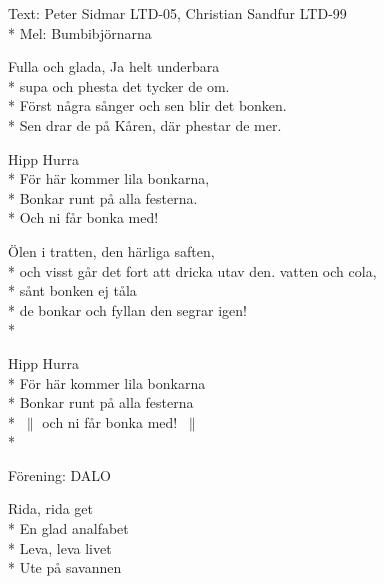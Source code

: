 \begin{SongText}[Bonksången]
    \begin{SongInfo}
        Text: Peter Sidmar LTD-05, Christian Sandfur LTD-99\\*%
        Mel: Bumbibjörnarna
    \end{SongInfo}
    \begin{SongVerse}
        Fulla och glada, Ja helt underbara\\*%
        supa och phesta det tycker de om.\\*%
        Först några sånger och sen blir det bonken.\\*%
        Sen drar de på Kåren, där phestar de mer.
    \end{SongVerse}
    \begin{SongVerse}
        Hipp Hurra\\*%
        För här kommer lila bonkarna,\\*%
        Bonkar runt på alla festerna.\\*%
        Och ni får bonka med!
    \end{SongVerse}
    \begin{SongVerse}
        Ölen i tratten, den härliga saften,\\*%
        och visst går det fort att dricka utav den.
        vatten och cola,\\*%
        sånt bonken ej tåla\\*%
        de bonkar och fyllan den segrar igen!\\*%
    \end{SongVerse}
    \begin{SongVerse}
        Hipp Hurra\\*%
        För här kommer lila bonkarna\\*%
        Bonkar runt på alla festerna\\*%
        $\:\|$ och ni får bonka med! $\:\|$\\*%
    \end{SongVerse}
\end{SongText}

\begin{SongText}
    \begin{SongInfo}
        Förening: DALO
    \end{SongInfo}
    \begin{SongVerse}
        Rida, rida get\\*%
        En glad analfabet\\*%
        Leva, leva livet\\*%
        Ute på savannen
    \end{SongVerse}
\end{SongText}

